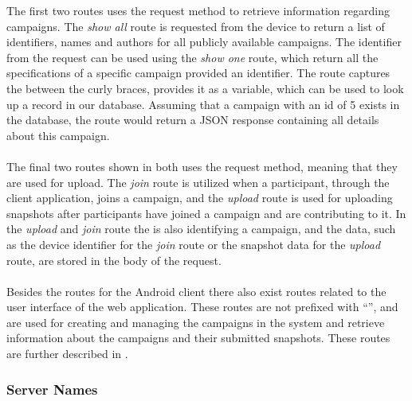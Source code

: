 \FloatBarrier
The first two routes uses the  request method  to retrieve information regarding campaigns. The \emph{show all} route is requested from the device to return a list of identifiers, names and authors for all publicly available campaigns. The identifier from the request can be used using the \emph{show one} route, which return all the specifications of a specific campaign provided an identifier. The route captures the  between the curly braces, provides it as a variable, which can be used to look up a record in our database. Assuming that a campaign with an id of 5 exists in the database, the route  would return a JSON response containing all details about this campaign. 
\\\\
The final two routes shown in  both uses the  request method, meaning that they are used for upload. The \emph{join} route is utilized when a participant, through the client application, joins a campaign, and the \emph{upload} route is used for uploading snapshots after participants have joined a campaign and are contributing to it. In the \emph{upload} and \emph{join} route the  is also identifying a campaign, and the data, such as the device identifier for the \emph{join} route or the snapshot data for the \emph{upload} route, are stored in the body of the request. 
\\\\
Besides the routes for the Android client there also exist routes related to the user interface of the web application. These routes are not prefixed with ``'', and are used for creating and managing the campaigns in the system and retrieve information about the campaigns and their submitted snapshots. These routes are further described in . 

\subsubsection{Server Names}
\label{sub:server_names}

